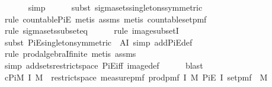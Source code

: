 \begin{isabellebody}
\ \ \ \ \ \isamarkupfalse%
\ simp\isanewline
\ \ \ \ \isamarkupfalse%
\ {\isacharparenleft}{\kern0pt}subst\ sigma{\isacharunderscore}{\kern0pt}sets{\isacharunderscore}{\kern0pt}singletons{\isacharbrackleft}{\kern0pt}symmetric{\isacharbrackright}{\kern0pt}{\isacharparenright}{\kern0pt}\isanewline
\ \ \ \ \ \isamarkupfalse%
\ {\isacharparenleft}{\kern0pt}rule\ countable{\isacharunderscore}{\kern0pt}PiE{\isacharcomma}{\kern0pt}\ metis\ assms{\isacharparenleft}{\kern0pt}{}{\isacharparenright}{\kern0pt}{\isacharcomma}{\kern0pt}\ metis\ countable{\isacharunderscore}{\kern0pt}set{\isacharunderscore}{\kern0pt}pmf{\isacharparenright}{\kern0pt}\isanewline
\ \ \ \ \isamarkupfalse%
\ {\isacharparenleft}{\kern0pt}rule\ sigma{\isacharunderscore}{\kern0pt}sets{\isacharunderscore}{\kern0pt}subseteq{\isacharparenright}{\kern0pt}\isanewline
\ \ \ \ \isamarkupfalse%
\ {\isacharparenleft}{\kern0pt}rule\ image{\isacharunderscore}{\kern0pt}subsetI{\isacharparenright}{\kern0pt}\isanewline
\ \ \ \ \isamarkupfalse%
\ {\isacharparenleft}{\kern0pt}subst\ PiE{\isacharunderscore}{\kern0pt}singleton{\isacharbrackleft}{\kern0pt}symmetric{\isacharcomma}{\kern0pt}\ \ A{\isacharequal}{\kern0pt}{\isachardoublequoteopen}I{\isachardoublequoteclose}{\isacharbrackright}{\kern0pt}{\isacharcomma}{\kern0pt}\ simp\ add{\isacharcolon}{\kern0pt}PiE{\isacharunderscore}{\kern0pt}def{\isacharparenright}{\kern0pt}\isanewline
\ \ \ \ \isamarkupfalse%
\ {\isacharparenleft}{\kern0pt}rule\ prod{\isacharunderscore}{\kern0pt}algebraI{\isacharunderscore}{\kern0pt}finite{\isacharcomma}{\kern0pt}\ metis\ assms{\isacharparenleft}{\kern0pt}{}{\isacharparenright}{\kern0pt}{\isacharparenright}{\kern0pt}\isanewline
\ \ \ \ \isamarkupfalse%
\ {\isacharparenleft}{\kern0pt}simp\ add{\isacharcolon}{\kern0pt}sets{\isacharunderscore}{\kern0pt}restrict{\isacharunderscore}{\kern0pt}space\ PiE{\isacharunderscore}{\kern0pt}iff\ image{\isacharunderscore}{\kern0pt}def{\isacharparenright}{\kern0pt}\isanewline
\ \ \ \ \isamarkupfalse%
\ blast\isanewline
\isanewline
\ \ \isamarkupfalse%
\ c{\isacharcolon}{\kern0pt}{\isachardoublequoteopen}PiM\ I\ M{\isacharprime}{\kern0pt}\ {\isacharequal}{\kern0pt}\ restrict{\isacharunderscore}{\kern0pt}space\ {\isacharparenleft}{\kern0pt}measure{\isacharunderscore}{\kern0pt}pmf\ {\isacharparenleft}{\kern0pt}prod{\isacharunderscore}{\kern0pt}pmf\ I\ M{\isacharparenright}{\kern0pt}{\isacharparenright}{\kern0pt}\ {\isacharparenleft}{\kern0pt}PiE\ I\ {\isacharparenleft}{\kern0pt}set{\isacharunderscore}{\kern0pt}pmf\ {\isasymcirc}\ M{\isacharparenright}{\kern0pt}{\isacharparenright}{\kern0pt}{\isachardoublequoteclose}\isanewline

\end{isabellebody}
